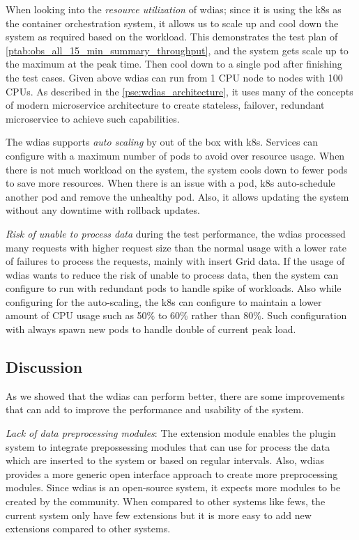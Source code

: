 \documentclass[conference]{IEEEtran}
\begin{document}
When looking into the \emph{resource utilization} of \acrshort{wdias}; since it is using the \acrshort{k8s} as the container orchestration system, it allows us to scale up and cool down the system as required based on the workload. This demonstrates the test plan of \cref{ptab:obs_all_15_min_summary_throughput}, and the system gets scale up to the maximum at the peak time. Then cool down to a single pod after finishing the test cases.
Given above \acrshort{wdias} can run from 1 CPU node to nodes with 100 CPUs. As described in the \cref{pse:wdias_architecture}, it uses many of the concepts of modern microservice architecture to create stateless, failover, redundant microservice to achieve such capabilities.

The \acrshort{wdias} supports \emph{auto scaling} by out of the box with \acrshort{k8s}. Services can configure with a maximum number of pods to avoid over resource usage. When there is not much workload on the system, the system cools down to fewer pods to save more resources. When there is an issue with a pod, \acrshort{k8s} auto-schedule another pod and remove the unhealthy pod. Also, it allows updating the system without any downtime with rollback updates.

\emph{Risk of unable to process data} during the test performance, the \acrshort{wdias} processed many requests with higher request size than the normal usage with a lower rate of failures to process the requests, mainly with insert Grid data. If the usage of \acrshort{wdias} wants to reduce the risk of unable to process data, then the system can configure to run with redundant pods to handle spike of workloads. Also while configuring for the auto-scaling, the \acrshort{k8s} can configure to maintain a lower amount of CPU usage such as 50\% to 60\% rather  than 80\%. Such configuration with always spawn new pods to handle double of current peak load.

\subsection{Discussion}
\label{psubse:discussion}

As we showed that the \acrshort{wdias} can perform better, there are some improvements that can add to improve the performance and usability of the system.

\emph{Lack of data preprocessing modules}:
The extension module enables the plugin system to integrate prepossessing modules that can use for process the data which are inserted to the system or based on regular intervals. Also, \acrshort{wdias} provides a more generic open interface approach to create more preprocessing modules. Since \acrshort{wdias} is an open-source system, it expects more modules to be created by the community. When compared to other systems like \acrshort{fews}, the current system only have few extensions but it is more easy to add new extensions compared to other systems.
\end{document}
